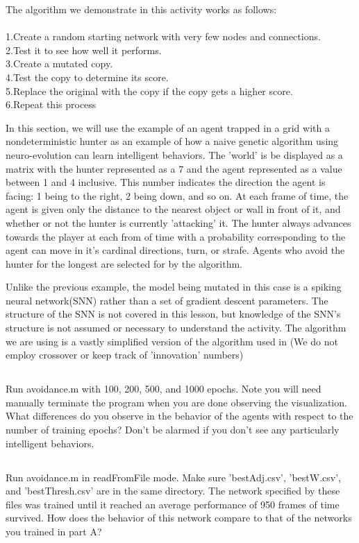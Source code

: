 \documentclass[12]{extarticle}
\begin{document}
The algorithm we demonstrate in this activity works as follows: \\
\\
1.Create a random starting network with very few nodes and connections.\\ 
2.Test it to see how well it performs. \\
3.Create a mutated copy. \\
4.Test the copy to determine its score. \\
5.Replace the original with the copy if the copy gets a higher score.\\
6.Repeat this process

In this section, we will use the example of an agent trapped in a grid with a nondeterministic hunter as an example of how a naive genetic algorithm using neuro-evolution can learn intelligent behaviors. The 'world' is be displayed as a matrix with the hunter represented as a 7 and the agent represented as a value between 1 and 4 inclusive. This number indicates the direction the agent is facing: 1 being to the right, 2 being down, and so on. At each frame of time, the agent is given only the distance to the nearest object or wall in front of it, and whether or not the hunter is currently 'attacking' it. The hunter always advances towards the player at each from of time with a probability corresponding to the agent can move in it's cardinal directions, turn, or strafe. Agents who avoid the hunter for the longest are selected for by the algorithm. 

Unlike the previous example, the model being mutated in this case is a spiking neural network(SNN) rather than a set of gradient descent parameters. The structure of the SNN is not covered in this lesson, but knowledge of the SNN's structure is not assumed or necessary to understand the activity. The algorithm we are using is a vastly simplified version of the algorithm used in \cite{Stanley}(We do not employ crossover or keep track of 'innovation' numbers)
\subsection{}
Run avoidance.m with 100, 200, 500, and 1000 epochs. Note you will need manually terminate the program when you are done observing the visualization.  What differences do you observe in the behavior of the agents with respect to the number of training epochs? Don't be alarmed if you don't see any particularly intelligent behaviors.
\subsection{}
Run avoidance.m in readFromFile mode. Make sure 'bestAdj.csv', 'bestW.csv', and 'bestThresh.csv' are in the same directory. The network specified by these files was trained until it reached an average performance of 950 frames of time survived. How does the behavior of this network compare to that of the networks you trained in part A?
\end{document}
